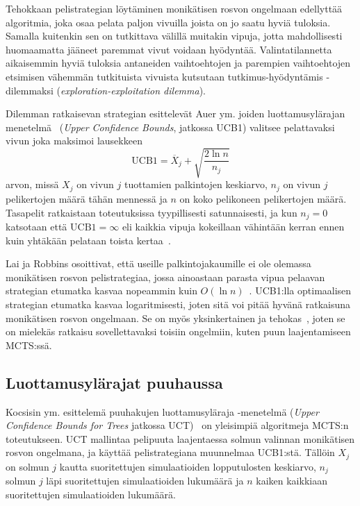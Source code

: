 \documentclass[12pt,finnish]{tktltiki2}
\theoremstyle{definition}
\theoremstyle{remark}
\begin{document}
Tehokkaan pelistrategian löytäminen monikätisen rosvon ongelmaan edellyttää algoritmia, joka osaa pelata paljon vivuilla joista on jo saatu hyviä tuloksia. Samalla kuitenkin sen on tutkittava välillä muitakin vipuja, jotta mahdollisesti huomaamatta jääneet paremmat vivut voidaan hyödyntää. Valintatilannetta aikaisemmin hyviä tuloksia antaneiden vaihtoehtojen ja parempien vaihtoehtojen etsimisen vähemmän tutkituista vivuista kutsutaan tutkimus-hyödyntämis -dilemmaksi (\textit{exploration-exploitation dilemma}).

Dilemman ratkaisevan strategian esittelevät Auer ym. joiden luottamusylärajan menetelmä~\cite{auer} (\textit{Upper Confidence Bounds}, jatkossa UCB1) valitsee pelattavaksi vivun joka maksimoi lausekkeen
\begin{equation}
\text{UCB1} = \overline{X}_j + \sqrt{\frac{2 \ln n}{n_j}}
\end{equation}
arvon, missä $X_j$ on vivun $j$ tuottamien palkintojen keskiarvo, $n_j$ on vivun $j$ pelikertojen määrä tähän mennessä ja $n$ on koko pelikoneen pelikertojen määrä. Tasapelit ratkaistaan toteutuksissa tyypillisesti satunnaisesti, ja kun $n_j = 0$ katsotaan että $\text{UCB1} = \infty$ eli kaikkia vipuja kokeillaan vähintään kerran ennen kuin yhtäkään pelataan toista kertaa~\cite{browne}.

Lai ja Robbins osoittivat, että useille palkintojakaumille ei ole olemassa monikätisen rosvon pelistrategiaa, jossa ainoastaan parasta vipua pelaavan strategian etumatka kasvaa nopeammin kuin $O(\ln n)$~\cite{lai, browne}. UCB1:lla optimaalisen strategian etumatka kasvaa logaritmisesti, joten sitä voi pitää hyvänä ratkaisuna monikätisen rosvon ongelmaan. Se on myös yksinkertainen ja tehokas~\cite{browne}, joten se on mielekäs ratkaisu sovellettavaksi toisiin ongelmiin, kuten puun laajentamiseen MCTS:ssä.

\subsection{Luottamusylärajat puuhaussa}

Kocsisin ym. esittelemä puuhakujen luottamusyläraja -menetelmä (\textit{Upper Confidence Bounds for Trees} jatkossa UCT)~\cite{browne, kocsis} on yleisimpiä algoritmeja MCTS:n toteutukseen. UCT mallintaa pelipuuta laajentaessa solmun valinnan monikätisen rosvon ongelmana, ja käyttää pelistrategiana muunnelmaa UCB1:stä. Tällöin $X_j$ on solmun $j$ kautta suoritettujen simulaatioiden lopputulosten keskiarvo, $n_j$ solmun $j$ läpi suoritettujen simulaatioiden lukumäärä ja $n$ kaiken kaikkiaan suoritettujen simulaatioiden lukumäärä.
\end{document}
